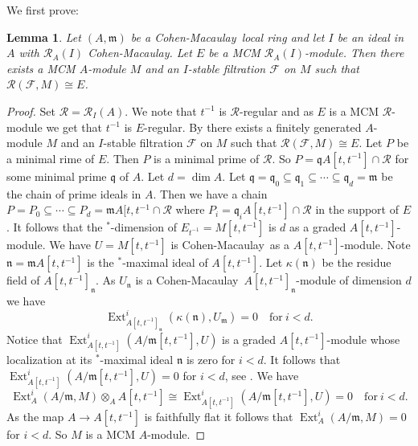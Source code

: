 \documentclass{amsart}
\newcommand{\CM}{Cohen-Macaulay}
\newcommand{\n}{\mathfrak{n} }
\newcommand{\m}{\mathfrak{m} }
\newcommand{\q}{\mathfrak{q} }
\newcommand{\eR}{\mathcal{R} }
\newcommand{\Fc}{\mathcal{F} }
\newcommand{\rt}{\rightarrow}
\newcommand{\Ext}{\operatorname{Ext}}
\theoremstyle{plain}
\newtheorem{lemma}[theorem]{Lemma}
\theoremstyle{definition}
\theoremstyle{remark}
\begin{document}
{We first prove:
\begin{lemma}
\label{bella-l} Let $(A,\m)$ be a \CM \ local ring and let $I$ be an ideal in $A$ with $\eR_A(I)$ \CM. Let $E$ be a MCM $\eR_A(I)$-module. Then there exists a MCM $A$-module $M$ and an $I$-stable filtration $\Fc$ on $M$ such that $\eR(\Fc, M) \cong  E$.
\end{lemma}
\begin{proof}
Set $\eR = \eR_I(A)$.
We note that $t^{-1}$ is $\eR$-regular and as $E$ is a MCM $\eR$-module we get that $t^{-1}$ is $E$-regular.
By \cite[3.1]{P-Itoh-g} there exists a finitely generated $A$-module $M$ and an $I$-stable filtration $\Fc$ on $M$ such that $\eR(\Fc, M) \cong  E$.
Let $P$ be a minimal rime of $E$. Then $P$ is a minimal prime of $\eR$. So $P = \q A[t, t^{-1}] \cap \eR$ for some minimal prime $\q $ of $A$. Let $d = \dim A$. Let $\q = \q_0 \subseteq \q_1 \subseteq \cdots \subseteq \q_d = \m$ be the chain of prime ideals in $A$. Then we have a chain $P= P_0 \subseteq \cdots \subseteq P_d = \m A[t,t^{-1} \cap \eR$  where $P_i = \q_i A[t,t^{-1}] \cap \eR$ in the  support of $E$. It follows that the $^*$-dimension of $E_{t^{-1}} = M[t,t^{-1}]$ is $d$ as a  graded $A[t,t^{-1}]$-module.  We have $U = M[t,t^{-1}]$ is \CM \ as a $A[t,t^{-1}]$-module. Note $\n = \m A[t,t^{-1}]$ is
 the $^*$-maximal ideal of $A[t,t^{-1}]$. Let $\kappa(\n)$ be the residue field of $A[t,t^{-1}]_\n$. As $U_\n$ is a  \CM  \  $A[t,t^{-1}]_\n$-module of dimension $d$ we have
 $$\Ext^i_{A[t,t^{-1}]_\n}(\kappa(\n), U_\m) = 0 \quad \text{for} \ i < d. $$
 Notice that $\Ext^i_{A[t,t^{-1}]}(A/\m[t,t^{-1}], U)$ is a graded $A[t,t^{-1}]$-module whose localization at its $^*$-maximal ideal $\n$ is zero for $i < d$. It follows that \\
  $\Ext^i_{A[t,t^{-1}]}(A/\m[t,t^{-1}], U) = 0$ for $i < d$, see \cite[1.5.15]{BH}. We have
  $$\Ext^i_A(A/\m, M)\otimes_A A[t,t^{-1}]  \cong \Ext^i_{A[t,t^{-1}]}(A/\m[t,t^{-1}], U) = 0 \quad \text{for} \ i < d.$$
  As the map $A \rt A[t,t^{-1}]$ is faithfully flat it follows that $\Ext^i_A(A/\m, M) = 0$ for $i < d$. So $M$ is a MCM $A$-module.
\end{proof}

}
\end{document}
